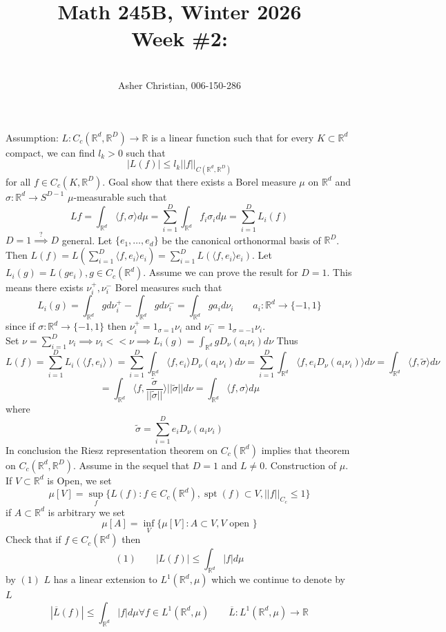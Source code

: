 \documentclass[11pt]{article}
\newcommand{\cnum}{Math 245B}
\newcommand{\ced}{Winter 2026}
\newcommand{\ctitle}[4]{\title{\vspace{-0.5in}\cnum, \ced\\Week #1: #2}\author{\vspace{-0.35in}\\#3, #4}}
\DeclareMathOperator{\spt}{spt}
\begin{document}
\ctitle{\#2}{}{Asher Christian}{006-150-286}
\date{}
\maketitle
Assumption: $L: C_c( \mathbb{R}^{d}, \mathbb{R}^{D}) \rightarrow \mathbb{R}$ is a linear function such that for every $K \subset \mathbb{R}^{d}$ compact, we can find $l_k > 0$ such that
 \[
     |L(f)| \le l_k ||f||_{C( \mathbb{R}^{d}, \mathbb{R}^{D})}
\] 
for all $f \in C_c(K, \mathbb{R}^{D})$. Goal show that there exists a Borel measure $\mu$ on $ \mathbb{R}^{d}$ and $\sigma : \mathbb{R}^{d} \rightarrow S^{D-1}$ 
$\mu$-measurable such that
\[
Lf = \int_{ \mathbb{R}^{d}}^{} \langle f, \sigma \rangle d \mu = \sum_{i=1}^{D}\int_{ \mathbb{R}^{d}}^{}f_i \sigma_i d \mu = \sum_{i=1}^{D}L_i(f)
\] 
$D = 1 \stackrel{?}{\implies} D$ general.
Let $\{e_1,\dots,e_d\}$ be the canonical orthonormal basis of $ \mathbb{R}^{D}$. Then $L(f) = L(\sum_{i=1}^{D}\langle f, e_i \rangle e_i) = \sum_{i=1}^{D}L(\langle f, e_i \rangle e_i)$.
Let $L_i(g) = L(ge_i), g \in C_c( \mathbb{R}^{d})$. Assume we can prove the result for $D = 1$. This means there exists $\nu_i^{+}, \nu_i^{-}$ Borel measures such that
\[
    L_i(g) = \int_{ \mathbb{R}^{d}}^{}g d \nu_i^{+} - \int_{ \mathbb{R}^{d}}^{}g d \nu_i^{-} = \int_{ \mathbb{R}^{d}}^{}g a_i d \nu_i \qquad a_i : \mathbb{R}^{d} \rightarrow \{-1,1\}
\] 
since if $\sigma : \mathbb{R}^{d} \rightarrow \{-1,1\}$ then $\nu_i^{+} = 1_{\sigma = 1} \nu_i$ and $\nu_i^{-} = 1_{\sigma = -1}\nu_i$.\\
Set $\nu = \sum_{i=1}^{D} \nu_i \implies \nu_i << \nu \implies L_i(g) = \int_{ \mathbb{R}^{d}}^{}g D_\nu(a_i \nu_i) d \nu$ Thus 
 \[
L(f) = \sum_{i=1}^{D}L_i(\langle f , e_i \rangle ) = \sum_{i=1}^{D}\int_{ \mathbb{R}^{d}}^{} \langle f, e_i \rangle D_\nu(a_i \nu_i) d \nu = \sum_{i=1}^{D} \int_{ \mathbb{R}^{d}}^{} \langle f, e_i D_\nu(a_i \nu_i) \rangle d \nu = \int_{ \mathbb{R}^{d}}^{} \langle f, \tilde \sigma \rangle d \nu
\] 
\[
= \int_{ \mathbb{R}^{d}}^{} \langle f, \frac{\tilde \sigma}{ || \tilde \sigma ||} \rangle ||\tilde \sigma|| d \nu = \int_{ \mathbb{R}^{d}}^{} \langle f, \sigma \rangle d \mu
\] 
where
\[
\tilde \sigma = \sum_{i=1}^{D}e_i D_\nu(a_i\nu_i)
\] 
In conclusion the Riesz representation theorem on $C_c( \mathbb{R}^{d})$ implies that theorem on $C_c( \mathbb{R}^{d}, \mathbb{R}^{D})$.
Assume in the sequel that $D=1$ and  $L \ne 0$. Construction of  $\mu $. If $V \subset \mathbb{R}^{d}$ is Open, we set 
\[
    \mu[V] = \sup_{f}\{ L(f) : f \in C_c( \mathbb{R}^{d}) , \spt(f) \subset V, ||f||_{C_c} \le 1\}
\] 
if $A \subset \mathbb{R}^{d}$ is arbitrary we set
\[
    \mu[A] = \inf_{V}\{\mu[V] : A \subset V, V \text{ open }\}
\] 
Check that if $f \in C_c( \mathbb{R}^{d})$ then
\[
    (1) \qquad |L(f)| \le \int_{ \mathbb{R}^{d}}^{}|f| d \mu
\] 
by $(1)$  $L$ has a linear extension to $L^{1}( \mathbb{R}^{d}, \mu)$ which we continue to denote by $L$
 \[
     |\overline{L}(f)| \le \int_{ \mathbb{R}^{d}}^{}|f| d \mu \forall f \in L^{1} ( \mathbb{R}^{d}, \mu) \qquad \overline{L} : L^{1} ( \mathbb{R}^{d}, \mu) \rightarrow \mathbb{R}
\]
\end{document}
